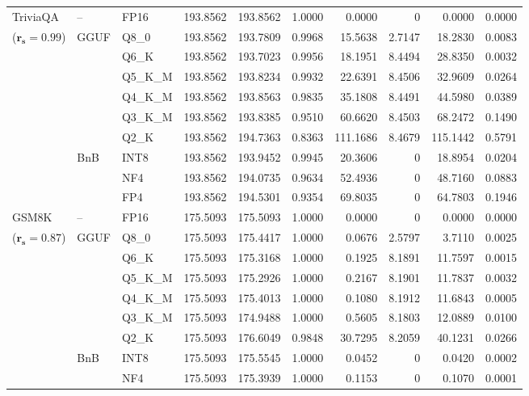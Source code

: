 \begin{longtable}{ll l rrrrrrr}
\midrule
TriviaQA & -- & FP16 & 193.8562 & 193.8562 & 1.0000 & 0.0000 & \cellcolor{cyan!12} $0$ & 0.0000 & 0.0000 \\
{\small ($\mathbf{r_s{=}0.99}$)} & GGUF & Q8\_0 & 193.8562 & 193.7809 & 0.9968 & 15.5638 & 2.7147 & 18.2830 & 0.0083 \\
 &  & Q6\_K & 193.8562 & 193.7023 & 0.9956 & 18.1951 & 8.4494 & 28.8350 & 0.0032 \\
 &  & Q5\_K\_M & 193.8562 & 193.8234 & 0.9932 & 22.6391 & 8.4506 & 32.9609 & 0.0264 \\
 &  & Q4\_K\_M & 193.8562 & 193.8563 & 0.9835 & 35.1808 & 8.4491 & 44.5980 & 0.0389 \\
 &  & Q3\_K\_M & 193.8562 & 193.8385 & 0.9510 & 60.6620 & 8.4503 & 68.2472 & 0.1490 \\
 &  & Q2\_K & 193.8562 & 194.7363 & \cellcolor{red!18} 0.8363 & \cellcolor{red!18} 111.1686 & 8.4679 & \cellcolor{red!18} 115.1442 & \cellcolor{red!18} 0.5791 \\
 & BnB & INT8 & 193.8562 & 193.9452 & 0.9945 & 20.3606 & \cellcolor{cyan!12} $0$ & 18.8954 & 0.0204 \\
 &  & NF4 & 193.8562 & 194.0735 & 0.9634 & 52.4936 & \cellcolor{cyan!12} $0$ & 48.7160 & 0.0883 \\
 &  & FP4 & 193.8562 & 194.5301 & \cellcolor{red!18} 0.9354 & \cellcolor{red!18} 69.8035 & \cellcolor{cyan!12} $0$ & \cellcolor{red!18} 64.7803 & \cellcolor{red!18} 0.1946 \\
\midrule
GSM8K & -- & FP16 & 175.5093 & 175.5093 & 1.0000 & 0.0000 & \cellcolor{cyan!12} $0$ & 0.0000 & 0.0000 \\
{\small ($\mathbf{r_s{=}0.87}$)} & GGUF & Q8\_0 & 175.5093 & 175.4417 & 1.0000 & 0.0676 & 2.5797 & 3.7110 & 0.0025 \\
 &  & Q6\_K & 175.5093 & 175.3168 & 1.0000 & 0.1925 & 8.1891 & 11.7597 & 0.0015 \\
 &  & Q5\_K\_M & 175.5093 & 175.2926 & 1.0000 & 0.2167 & 8.1901 & 11.7837 & 0.0032 \\
 &  & Q4\_K\_M & 175.5093 & 175.4013 & 1.0000 & 0.1080 & 8.1912 & 11.6843 & 0.0005 \\
 &  & Q3\_K\_M & 175.5093 & 174.9488 & 1.0000 & 0.5605 & 8.1803 & 12.0889 & 0.0100 \\
 &  & Q2\_K & 175.5093 & 176.6049 & 0.9848 & 30.7295 & 8.2059 & 40.1231 & 0.0266 \\
 & BnB & INT8 & 175.5093 & 175.5545 & 1.0000 & 0.0452 & \cellcolor{cyan!12} $0$ & 0.0420 & 0.0002 \\
 &  & NF4 & 175.5093 & 175.3939 & 1.0000 & 0.1153 & \cellcolor{cyan!12} $0$ & 0.1070 & 0.0001 \\

\end{longtable}
